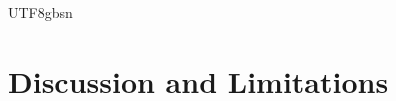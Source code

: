 \documentclass[]{mpai_report}
\begin{document}
\begin{CJK*}{UTF8}{gbsn}




\section{Discussion and Limitations}


\end{CJK*}
\end{document}
